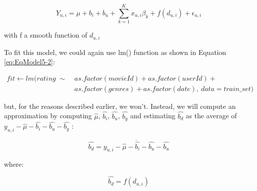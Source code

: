 \documentclass[
]{article}
\begin{document}
\label{eq:EqModel5-1} \begin{equation}
  Y_{u,i} = \mu + b_{i} + b_{u} + \sum_{k=1}^Kx_{u,i}\beta_k + f(d_{u,i}) + \epsilon_{u,i}
\end{equation}

\begin{center}
with f a smooth function of $d_{u,i}$
\end{center}

To fit this model, we could again use lm() function as shown in Equation
\ref{eq:EqModel5-2}:

%
\par

\label{eq:EqModel5-2} \begin{equation}
\begin{split}
  fit \leftarrow lm(rating \; \sim \; & as.factor(movieId) + as.factor(userId) + \\ 
  & as.factor(genres) + as.factor(date), \: data = train\_{}set)
\end{split}
\end{equation}

but, for the reasons described earlier, we won't. Instead, we will
compute an approximation by computing \(\hat{\mu}\), \(\hat{b_{i}}\),
\(\hat{b_{u}}\), \(\hat{b_{g}}\) and estimating \(\hat{b_{d}}\) as the
average of \(y_{u,i}-\hat{\mu}-\hat{b_{i}}-\hat{b_{u}}-\hat{b_{g}}\) :\\

%
\par

\label{eq:EqModel5-3} \begin{equation}
  \hat{b_{d}} = \overline{y_{u,i} - \hat{\mu} - \hat{b_{i}} - \hat{b_{u}}  - \hat{b_{u}}}
\end{equation}

where:

%
\par

\label{eq:EqModel5-4} \begin{equation}
  \hat{b_{d}} = f(d_{u,i})
\end{equation}
\end{document}
